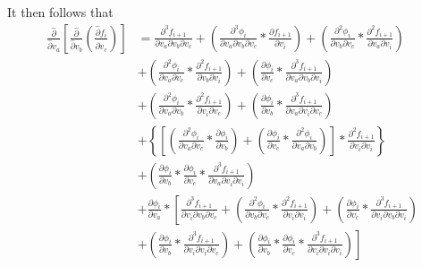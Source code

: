 \documentclass[12pt,letter]{article}
\begin{document}
	It then follows that
	\begin{equation}
	\begin{split}
	\frac{\hat{\partial}}{\hat{\partial}  v_a}\left[\frac{\hat{\partial}}{\hat{\partial} v_b}\left(\frac{\hat{\partial} f_i}{\hat{\partial} v_c}\right)\right]
	&= 
	\frac{\partial^3 f_{i+1}}{\partial v_a \partial v_b \partial v_c} + 
	\left(\frac{\partial^3 \phi_i}{\partial v_a \partial v_b \partial v_c} * \frac{\partial f_{i+1}}{\partial v_i}\right) + 
	\left(\frac{\partial^2 \phi_i}{\partial v_b \partial v_c} * \frac{\partial^2 f_{i+1}}{\partial v_a \partial v_i}\right) 
	\\
	&+
	\left(\frac{\partial^2 \phi_i}{\partial v_a \partial v_c} * \frac{\partial^2 f_{i+1}}{\partial v_b \partial v_i}\right) + 
	\left(\frac{\partial \phi_i}{\partial v_c} * \frac{\partial^3 f_{i+1}}{\partial v_a \partial v_b \partial v_i}\right) 
	\\
	&+
	\left(\frac{\partial^2 \phi_i}{\partial v_a \partial v_b} * \frac{\partial^2 f_{i+1}}{\partial v_i \partial v_c}\right) + 
	\left(\frac{\partial \phi_i}{\partial v_b} * \frac{\partial^3 f_{i+1}}{\partial v_a \partial v_i \partial v_c}\right)
	\\
	&+
	\left\{\left[\left(\frac{\partial^2 \phi_i}{\partial v_a \partial v_c} * \frac{\partial \phi_i}{\partial v_b}\right) + 
	\left(\frac{\partial \phi_i}{\partial v_c} * \frac{\partial^2 \phi_i}{\partial v_a \partial v_b}\right)\right] * \frac{\partial^2 f_{i+1}}{\partial v_i \partial v_i}\right\}
	\\
	&+
	\left(\frac{\partial \phi_i}{\partial v_b} * \frac{\partial \phi_i}{\partial v_c} * \frac{\partial^3 f_{i+1}}{\partial v_a \partial v_i \partial v_i}\right) 
	\\
	&+
	\frac{\partial \phi_i}{\partial v_a} * 
	\left[\frac{\partial^3 f_{i+1}}{\partial v_i \partial v_b \partial v_c} + 
	\left(\frac{\partial^2 \phi_i}{\partial v_b \partial v_c} * \frac{\partial^2 f_{i+1}}{\partial v_i \partial v_i}\right) + 
	\left(\frac{\partial \phi_i}{\partial v_c} * \frac{\partial^3 f_{i+1}}{\partial v_i \partial v_b \partial v_i}\right) 
	\right.
	\\
	&
	\left.
	+ \left(\frac{\partial \phi_i}{\partial v_b} * \frac{\partial^3 f_{i+1}}{\partial v_i \partial v_i \partial v_c}\right) + 
	\left(\frac{\partial \phi_i}{\partial v_b} * \frac{\partial \phi_i}{\partial v_c} * \frac{\partial^3 f_{i+1}}{\partial v_i \partial v_i \partial v_i}\right)\right]
	\end{split}
	\end{equation}
	
\end{document}
